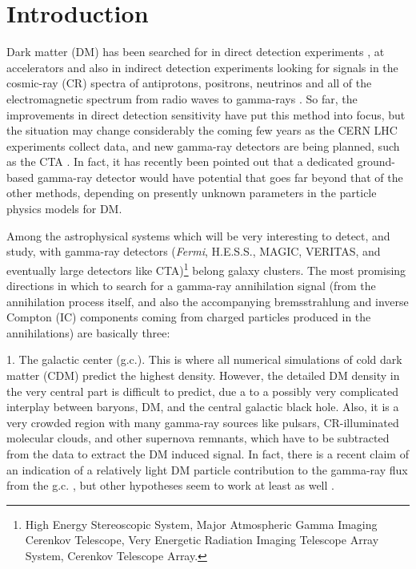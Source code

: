 \documentclass[10pt,aps,pra,reprint,amsmath,amsfonts,amssymb,showpacs,nofootinbib,floatfix]{revtex4-1}
\newcommand{\Fermi}{{\em Fermi}\xspace}
\begin{document}
\maketitle
\section{Introduction}

Dark matter (DM) has been searched for in direct detection experiments
\cite{Pato:2010zk}, at accelerators
\cite{Ellis:2001hv,Baer:2006ff,Khachatryan:2011tk} and also in
indirect detection experiments looking for signals in the cosmic-ray
(CR) spectra of antiprotons, positrons, neutrinos and all of the
electromagnetic spectrum from radio waves to gamma-rays
\cite{Bergstrom:2009ib}. So far, the improvements in direct detection
sensitivity have put this method into focus, but the situation may
change considerably the coming few years as the CERN LHC experiments
collect data, and new gamma-ray detectors are being planned, such as
the CTA \cite{Consortium:2010bc}. In fact, it has recently been
pointed out \cite{Bergstrom:2010gh} that a dedicated ground-based
gamma-ray detector would have potential that goes far beyond that of
the other methods, depending on presently unknown parameters in the
particle physics models for DM.

Among the astrophysical systems which will be very interesting to detect, and
study, with gamma-ray detectors (\Fermi, H.E.S.S., MAGIC, VERITAS, and
eventually large detectors like CTA)\footnote{{High Energy Stereoscopic System,
    Major Atmospheric Gamma Imaging Cerenkov Telescope, Very Energetic Radiation
    Imaging Telescope Array System, Cerenkov Telescope Array.}} belong galaxy
clusters. The most promising directions in which to search for a gamma-ray
annihilation signal (from the annihilation process itself, and also the
accompanying bremsstrahlung and inverse Compton (IC) components coming from
charged particles produced in the annihilations) are basically three:

1. The galactic center (g.c.). This is where all numerical simulations of cold
dark matter (CDM) predict the highest density. However, the detailed DM density
in the very central part is difficult to predict, due a to a possibly very
complicated interplay between baryons, DM, and the central galactic black
hole. Also, it is a very crowded region with many gamma-ray sources like
pulsars, CR-illuminated molecular clouds, and other supernova remnants, which
have to be subtracted from the data to extract the DM induced signal. In fact,
there is a recent claim of an indication of a relatively light DM particle
contribution to the gamma-ray flux from the g.c. \cite{2010arXiv1010.2752H}, but
other hypotheses seem to work at least as well \cite{2010arXiv1012.5839B}.
\end{document}
